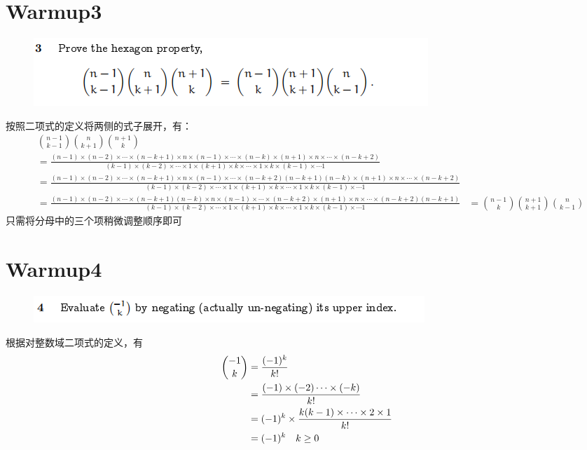 \documentclass[]{article}
\begin{document}
\section*{Warmup3}
\begin{figure}[H]
    \includegraphics[scale = 0.8]{2023-03-29-19-27-19.png}
\end{figure}
按照二项式的定义将两侧的式子展开，有：
\begin{align}
    &\binom{n-1}{k-1}\binom{n}{k+1}\binom{n+1}{k} \\
    &= \frac{(n-1) \times (n -2) \times \cdots \times (n-k+1) \times n \times (n-1) \times \cdots \times (n-k) \times (n+1) \times n \times \cdots \times (n - k + 2)}{(k-1)\times (k-2) \times \cdots \times 1 \times (k+1) \times k \times \cdots \times 1 \times k \times (k-1) \times \cdots 1}\\
    &= \frac{(n-1) \times (n -2) \times \cdots \times (n-k+1) \times n \times (n-1) \times \cdots \times (n-k+2)(n-k+1)(n-k) \times (n+1) \times n \times \cdots \times (n - k + 2)}{(k-1)\times (k-2) \times \cdots \times 1 \times (k+1) \times k \times \cdots \times 1 \times k \times (k-1) \times \cdots 1}
    \\
    &=\frac{(n-1) \times (n -2) \times \cdots \times (n-k+1)(n-k) \times n \times (n-1) \times \cdots \times (n-k+2)\times (n+1) \times n \times \cdots \times (n - k + 2)(n-k+1)}{(k-1)\times (k-2) \times \cdots \times 1 \times (k+1) \times k \times \cdots \times 1 \times k \times (k-1) \times \cdots 1}
    & = \binom{n-1}{k} \binom{n+1}{k+1} \binom{n}{k-1}
\end{align}
只需将分母中的三个项稍微调整顺序即可


\section*{Warmup4}
\begin{figure}[H]
    \includegraphics[scale = 0.8]{2023-03-29-19-27-32.png}
\end{figure}
根据对整数域二项式的定义，有
\begin{align}
    \binom{-1}{k} &= \frac{(-1)^k}{k!}\\
    &=\frac{(-1) \times (-2) \cdots \times (-k)}{k! }\\
    &=(-1)^k \times \frac{k(k-1) \times \cdots \times  2\times  1}{k!}\\
    &=(-1)^k \text {\quad  $ k \ge 0$}
\end{align}
\end{document}
